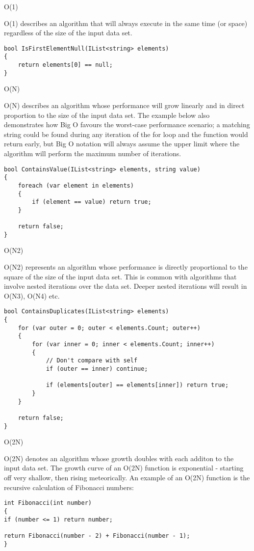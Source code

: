 \documentclass{beamer}
\begin{document}
\begin{frame}[fragile]
O(1)

O(1) describes an algorithm that will always execute in the same time (or space) regardless of the size of the input data set.
\begin{verbatim}
bool IsFirstElementNull(IList<string> elements)
{
	return elements[0] == null;
}
\end{verbatim}
\end{frame}
\begin{frame}[fragile]
O(N)

O(N) describes an algorithm whose performance will grow linearly and in direct proportion to the size of the input data set. The example below also demonstrates how Big O favours the worst-case performance scenario; a matching string could be found during any iteration of the for loop and the function would return early, but Big O notation will always assume the upper limit where the algorithm will perform the maximum number of iterations.
\begin{verbatim}
bool ContainsValue(IList<string> elements, string value)
{
	foreach (var element in elements)
	{
		if (element == value) return true;
	}
	
	return false;
}

\end{verbatim}
\end{frame}
\begin{frame}[fragile]
O(N2)

O(N2) represents an algorithm whose performance is directly proportional to the square of the size of the input data set. This is common with algorithms that involve nested iterations over the data set. Deeper nested iterations will result in O(N3), O(N4) etc.
\begin{verbatim}
bool ContainsDuplicates(IList<string> elements)
{
	for (var outer = 0; outer < elements.Count; outer++)
	{
		for (var inner = 0; inner < elements.Count; inner++)
		{
			// Don't compare with self
			if (outer == inner) continue;
			
			if (elements[outer] == elements[inner]) return true;
		}
	}
	
	return false;
}

\end{verbatim}
\end{frame}
\begin{frame}[fragile]
O(2N)

O(2N) denotes an algorithm whose growth doubles with each additon to the input data set. The growth curve of an O(2N) function is exponential - starting off very shallow, then rising meteorically. An example of an O(2N) function is the recursive calculation of Fibonacci numbers:
\begin{verbatim}
int Fibonacci(int number)
{
if (number <= 1) return number;

return Fibonacci(number - 2) + Fibonacci(number - 1);
}
\end{verbatim}


\end{frame}
\end{document}
